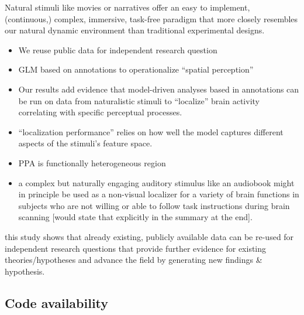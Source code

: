 \documentclass[english]{article}
\begin{document}

Natural stimuli like movies \citep{eickhoff2020towards,
hasson2008neurocinematics, sonkusare2019naturalistic} or narratives
\citep{hamilton2018revolution, honey2012not, lerner2011topographic,
silbert2014coupled, wilson2008beyond} offer an easy to implement, (continuous,)
complex, immersive, task-free paradigm that more closely resembles our natural
dynamic environment than traditional experimental designs.

\begin{itemize}
\item We reuse public data for independent research question
\item GLM based on annotations to operationalize ``spatial perception''
\item Our results add evidence that model-driven analyses based in annotations
can be run on data from naturalistic stimuli to ``localize'' brain activity
correlating with specific perceptual processes.
\item ``localization performance'' relies on how well the model captures
different aspects of the stimuli's feature space.
\item PPA is functionally heterogeneous region
\item a complex but naturally engaging auditory stimulus like an
audiobook might in principle be used as a non-visual localizer for a variety of
brain functions in subjects who are not willing or able to follow task
instructions during brain scanning [would state that explicitly in the summary
at the end].
\end{itemize}

this study shows that already existing, publicly
available data can be re-used for independent research questions that provide
further evidence for existing theories/hypotheses and advance the field by
generating new findings \& hypothesis.


\subsection*{Code availability}


\end{document}
